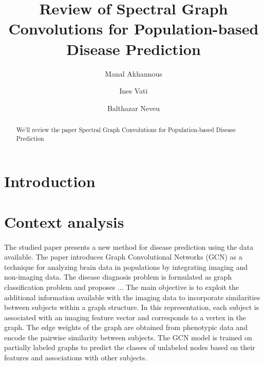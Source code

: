 \documentclass[sigconf]{acmart}
\begin{document}
\title{Review of Spectral Graph Convolutions for Population-based Disease Prediction}

\author{Manal Akhannous}

\author{Ines Vati}

\author{Balthazar Neveu}


\renewcommand{\shortauthors}{MVA et al.}

\begin{abstract}
  We'll review the paper Spectral Graph Convolutions for Population-based Disease Prediction \cite{Parisot17}
\end{abstract}





\maketitle

\section{Introduction}


\cite{Parisot17}
\section{Context analysis}

\paragraph{} The studied paper presents a new method for disease prediction using the data available.
The paper introduces Graph Convolutional Networks (GCN) as a technique for analyzing brain data in populations by 
integrating imaging and non-imaging data. The disease diagnosis problem is formulated as graph classification problem and proposes ...
The main objective is to exploit the additional information available with the imaging data 
to incorporate similarities between subjects within a graph structure. 
In this representation, each subject is associated with an imaging feature vector and corresponds to a vertex in the graph. 
The edge weights of the graph are obtained from phenotypic data and encode the pairwise similarity between subjects. 
The GCN model is trained on partially labeled graphs to predict the classes of unlabeled nodes based on their features 
and associations with other subjects.
\end{document}
